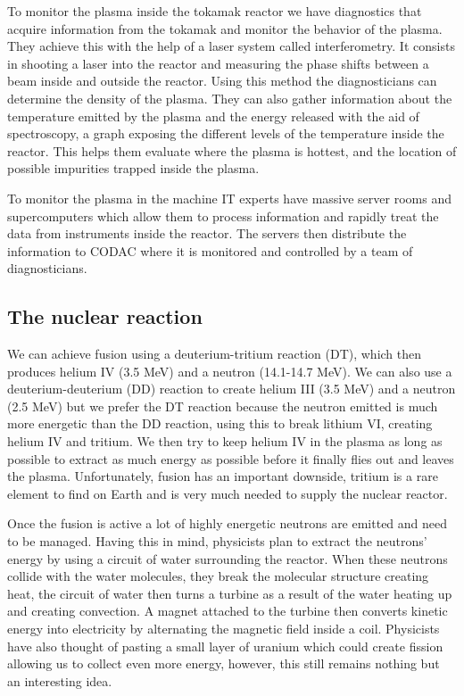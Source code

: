 \documentclass[11pt, openright]{book}
\begin{document}
\tab To monitor the plasma inside the tokamak reactor we have diagnostics that acquire information from the tokamak and monitor the behavior of the plasma. They achieve this with the help of a laser system called interferometry. It consists in shooting a laser into the reactor and measuring the phase shifts between a beam inside and outside the reactor. Using this method the diagnosticians can determine the density of the plasma. They can also gather information about the temperature emitted by the plasma and the energy released with the aid of spectroscopy, a graph exposing the different levels of the temperature inside the reactor. This helps them evaluate where the plasma is hottest, and the location of possible impurities trapped inside the plasma.

\tab To monitor the plasma in the machine IT experts have massive server rooms and supercomputers which allow them to process information and rapidly treat the data from instruments inside the reactor. The servers then distribute the information to CODAC where it is monitored and controlled by a team of diagnosticians.

\subsection{The nuclear reaction}


\tab We can achieve fusion using a deuterium-tritium reaction (DT), which then produces helium IV (3.5 MeV) and a neutron (14.1-14.7 MeV). We can also use a deuterium-deuterium (DD) reaction to create helium III (3.5 MeV) and a neutron (2.5 MeV) but we prefer the DT reaction because the neutron emitted is much more energetic than the DD reaction, using this to break lithium VI, creating helium IV and tritium. We then try to keep helium IV in the plasma as long as possible to extract as much energy as possible before it finally flies out and leaves the plasma. Unfortunately, fusion has an important downside, tritium is a rare element to find on Earth and is very much needed to supply the nuclear reactor.

\tab Once the fusion is active a lot of highly energetic neutrons are emitted and need to be managed. Having this in mind, physicists plan to extract the neutrons' energy by using a circuit of water surrounding the reactor. When these neutrons collide with the water molecules, they break the molecular structure creating heat, the circuit of water then turns a turbine as a result of the water heating up and creating convection. A magnet attached to the turbine then converts kinetic energy into electricity by alternating the magnetic field inside a coil. Physicists have also thought of pasting a small layer of uranium which could create fission allowing us to collect even more energy, however, this still remains nothing but an interesting idea.
\end{document}
